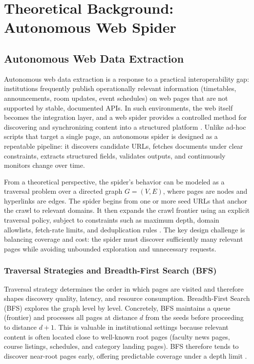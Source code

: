 \chapter{Theoretical Background: Autonomous Web Spider}
\label{chap:theoretical_background_web_spider}

\section{Autonomous Web Data Extraction}
Autonomous web data extraction is a response to a practical interoperability gap: institutions frequently publish operationally relevant information (timetables, announcements, room updates, event schedules) on web pages that are not supported by stable, documented APIs. In such environments, the web itself becomes the integration layer, and a web spider provides a controlled method for discovering and synchronizing content into a structured platform \cite{Sommerville2010}. Unlike ad-hoc scripts that target a single page, an autonomous spider is designed as a repeatable pipeline: it discovers candidate URLs, fetches documents under clear constraints, extracts structured fields, validates outputs, and continuously monitors change over time.

From a theoretical perspective, the spider’s behavior can be modeled as a traversal problem over a directed graph \(G=(V,E)\), where pages are nodes and hyperlinks are edges. The spider begins from one or more seed URLs that anchor the crawl to relevant domains. It then expands the crawl frontier using an explicit traversal policy, subject to constraints such as maximum depth, domain allowlists, fetch-rate limits, and deduplication rules \cite{Narayan2012}. The key design challenge is balancing coverage and cost: the spider must discover sufficiently many relevant pages while avoiding unbounded exploration and unnecessary requests.

\subsection{Traversal Strategies and Breadth-First Search (BFS)}
Traversal strategy determines the order in which pages are visited and therefore shapes discovery quality, latency, and resource consumption. Breadth-First Search (BFS) explores the graph level by level. Concretely, BFS maintains a queue (frontier) and processes all pages at distance \(d\) from the seeds before proceeding to distance \(d+1\). This is valuable in institutional settings because relevant content is often located close to well-known root pages (faculty news pages, course listings, schedules, and category landing pages). BFS therefore tends to discover near-root pages early, offering predictable coverage under a depth limit \cite{Sommerville2010}.


